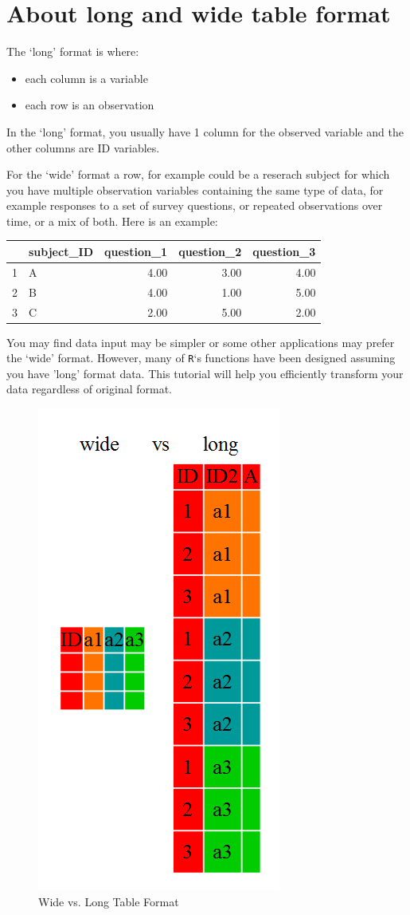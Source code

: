 \documentclass[]{book}
\providecommand{\tightlist}{%
  \setlength{\itemsep}{0pt}\setlength{\parskip}{0pt}}
\begin{document}
\hypertarget{about-long-and-wide-table-format}{%
\section{About long and wide table format}\label{about-long-and-wide-table-format}}

The `long' format is where:

\begin{itemize}
\tightlist
\item
  each column is a variable
\item
  each row is an observation
\end{itemize}

In the `long' format, you usually have 1 column for the observed variable and
the other columns are ID variables.

For the `wide' format a row, for example could be a reserach subject for which you have multiple observation variables containing the same type of data, for example responses to a set of survey questions, or repeated observations over time, or a mix of both. Here is an example:

\begin{table}[ht]
\centering
\begin{tabular}{rlrrr}
  \hline
 & subject\_ID & question\_1 & question\_2 & question\_3 \\ 
  \hline
1 & A & 4.00 & 3.00 & 4.00 \\ 
  2 & B & 4.00 & 1.00 & 5.00 \\ 
  3 & C & 2.00 & 5.00 & 2.00 \\ 
   \hline
\end{tabular}
\end{table}

You may find data input may be simpler or some other
applications may prefer the `wide' format. However, many of \texttt{R}`s functions have
been designed assuming you have 'long' format data. This tutorial will help you
efficiently transform your data regardless of original format.

\begin{figure}
\includegraphics[width=0.3\linewidth]{img/wide-vs-long} \caption{Wide vs. Long Table Format}\label{fig:wide-vs-long}
\end{figure}
\end{document}
